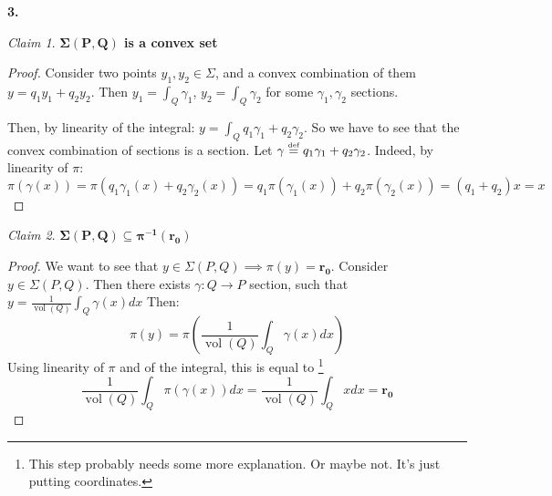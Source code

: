 \documentclass[10pt,a4paper]{article}
\DeclareMathOperator{\vol}{vol}
\def\defs{\stackrel{\tiny{\mbox{def}}}{=}}		%
\theoremstyle{plain}
\theoremstyle{remark}
\newtheorem{claim}{Claim}
\theoremstyle{definition}
\begin{document}
\textbf{3. }


\begin{claim}
	\label{clm:convex}
	\textbf{$\bm{\Sigma(P,Q)}$ is a convex set}
\end{claim}
\begin{proof}
	Consider two points $y_1,y_2 \in \Sigma$,
	and a convex combination of them $y= q_1y_1 + q_2y_2$. 
	Then $y_1 = \int_Q \gamma_1$, $y_2 = \int_Q \gamma_2$ 
	for some $\gamma_1,\gamma_2$ sections. 
	
	Then, by linearity of the integral:
	$y = \int_Q q_1\gamma_1 +q_2\gamma_2$. 
	So we have to see that the convex combination of sections is a section.
	Let $\gamma \defs q_1\gamma_1 +q_2\gamma_2$. 
	Indeed, by linearity of $\pi$:
	\begin{equation}
	\pi(\gamma(x)) = \pi(q_1\gamma_1(x) + q_2\gamma_2(x)) = q_1\pi(\gamma_1(x)) + q_2\pi(\gamma_2(x))
	= (q_1+q_2)x = x
	\end{equation}
\end{proof}

\begin{claim}
	\textbf{$\bm{\Sigma(P,Q) \subseteq \pi^{-1}(r_0)}$}
\end{claim}
\begin{proof}
	We want to see that $y\in\Sigma(P,Q) \implies \pi(y) = \bm{r_0}$.
	Consider $y\in \Sigma(P,Q)$. Then there exists $\gamma:Q\to P$ section,
	such that $y =\frac1{\vol(Q)} \int_Q \gamma(x)dx$
	Then:
	\begin{equation}
	\pi(y) = \pi\left(\frac{1}{\vol(Q)} \int_Q \gamma(x)dx\right)
	\end{equation}
	Using linearity of $\pi$ and of the integral, this is equal to
	\footnote{This step probably needs some more explanation. Or maybe not. It's just putting coordinates.}
	\begin{equation}
	\frac{1}{\vol(Q)}\int_Q \pi(\gamma(x))dx 
	= \frac{1}{\vol(Q)}\int_Q xdx 
	= \bm{r_0}
	\end{equation} 	
\end{proof}
\end{document}

